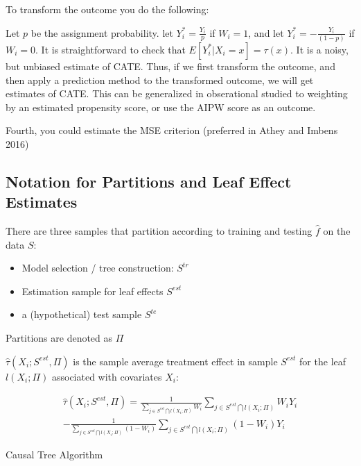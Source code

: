 \documentclass{article}
\begin{document}
To transform the outcome you do the following:

Let $p$ be the assignment probability. let $Y^*_i = \frac{Y_i}{p}$ if $W_i=1$, and let $Y^*_i =  - \frac{Y_i}{(1-p)}$ if $W_i = 0$. It is straightforward to check that $E [Y^*_i | X_i = x] = \tau (x)$. It is a noisy, but unbiased estimate of CATE. Thus, if we first transform the outcome, and then apply a prediction method to the transformed outcome, we will get estimates of CATE. This can be generalized in obserational studied to weighting by an estimated propensity score, or use the AIPW score as an outcome.

Fourth, you could estimate the MSE criterion (preferred in Athey and Imbens 2016)


\subsection{Notation for Partitions and Leaf Effect Estimates}

There are three samples that partition according to training and testing $\hat{f}$ on the data $S$:

\begin{itemize}
    \item Model selection / tree construction: $S^{tr}$
    \item Estimation sample for leaf effects $S^{est}$
    \item a (hypothetical) test sample $S^{te}$
\end{itemize}

Partitions are denoted as $\Pi$

$\hat{\tau}(X_i; S^{est}, \Pi)$ is the sample average treatment effect in sample $S^{est}$ for the leaf $l (X_i ; \Pi)$ associated with covariates $X_i$:

\begin{equation}
    \begin{aligned}
        \hat{\tau}(X_i; S^{est}, \Pi) = \frac{1}{\sum_{j \in S^{est} \bigcap l(X_i; \Pi)} W_i } \sum_{j \in S^{est} \bigcap l(X_i; \Pi)} W_i Y_i \\
        - \frac{1}{\sum_{j \in S^{est} \bigcap l(X_i; \Pi)}(1-W_i)}  \sum_{j \in S^{est} \bigcap l(X_i; \Pi)} (1-W_i) Y_i
    \end{aligned}
\end{equation}

Causal Tree Algorithm
\end{document}
